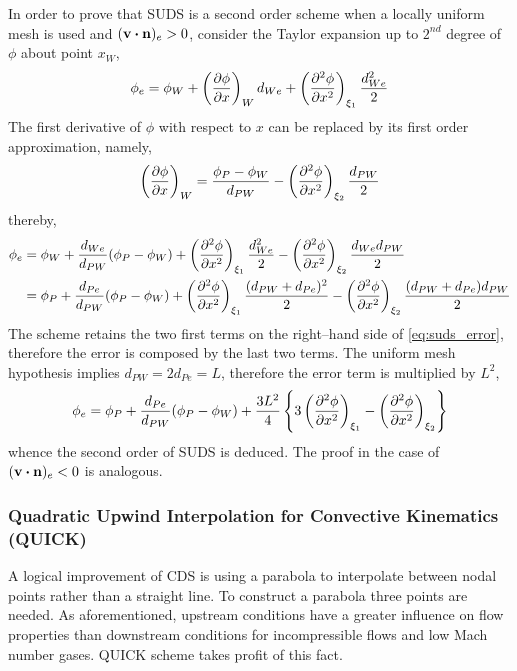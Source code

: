 In order to prove that SUDS is a second order scheme when a locally uniform mesh is used and $(\vb{v} \vdot \vb{n})_e > 0$, consider the Taylor expansion up to $2^{nd}$ degree of $\phi$ about point $x_W$,
\begin{equation}
	\phi_e = 
	\phi_W + 
	\left( \pdv{\phi}{x} \right)_W d_{We} + 
	\left( \pdv[2]{\phi}{x} \right)_{\xi_1} \frac{d_{We}^2}{2}
\end{equation}
The first derivative of $\phi$ with respect to $x$ can be replaced by its first order approximation, namely,
\begin{equation}
	\left(\pdv{\phi}{x}\right)_W = 
	\frac{\phi_P - \phi_W}{d_{PW}} - \left(\pdv[2]{\phi}{x}\right)_{\xi_2} \frac{d_{PW}}{2}
\end{equation}
thereby,
\begin{align}
	\phi_e 
	&= 
	\phi_W + 
	\frac{d_{We}}{d_{PW}} (\phi_P - \phi_W) + 
	\left( \pdv[2]{\phi}{x} \right)_{\xi_1} \frac{d_{We}^2}{2} - 
	\left( \pdv[2]{\phi}{x} \right)_{\xi_2} \frac{d_{We} d_{PW}}{2} \nonumber \\
	&= 
	\phi_P + 
	\frac{d_{Pe}}{d_{PW}} (\phi_P - \phi_W) + 
	\left( \pdv[2]{\phi}{x} \right)_{\xi_1} \frac{(d_{PW} + d_{Pe})^2}{2} - 
	\left( \pdv[2]{\phi}{x} \right)_{\xi_2} \frac{(d_{PW} + d_{Pe}) d_{PW}}{2}	
	\label{eq:suds_error}
\end{align}
The scheme retains the two first terms on the right--hand side of \eqref{eq:suds_error}, therefore the error is composed by the last two terms. The uniform mesh hypothesis implies $d_{PW} = 2 d_{Pe} = L$, therefore the error term is multiplied by $L^2$,
\begin{equation}
	\phi_e = 
	\phi_P + \frac{d_{Pe}}{d_{PW}} (\phi_P - \phi_W) + 
	\frac{3 L^2}{4}
	\left\{
	3 \left( \pdv[2]{\phi}{x} \right)_{\xi_1} - \left( \pdv[2]{\phi}{x} \right)_{\xi_2}
	\right\}
\end{equation}
whence the second order of SUDS is deduced. The proof in the case of $(\vb{v} \vdot \vb{n})_e < 0$ is analogous.


\subsubsection{Quadratic Upwind Interpolation for Convective Kinematics (QUICK)}

A logical improvement of CDS is using a parabola to interpolate between nodal points rather than a straight line. To construct a parabola three points are needed. As aforementioned, upstream conditions have a greater influence on flow properties than downstream conditions for incompressible flows and low Mach number gases. QUICK scheme takes profit of this fact. 

